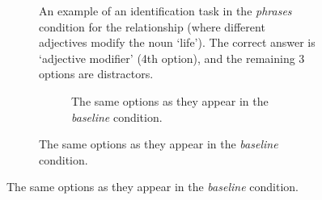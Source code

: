 \begin{figure}[th]
\begin{subfigure} {1.4\columnwidth}
			\centering
	\caption{\label{fig:task} An example of an identification task in the \emph{phrases} condition for the relationship  (where different adjectives modify the noun `life'). The correct answer is `adjective modifier' (4th option), and the remaining 3 options are distractors.}
	\end{subfigure}
	\qquad
	\begin{subfigure}{0.7\columnwidth}
		\begin{subfigure}{0.7\columnwidth}
				\centering
	    \caption {The same options as they appear in the \emph{baseline} condition. \label{fig:baseline-choices}}
	    \end{subfigure}


\end{subfigure}
\end{figure}
